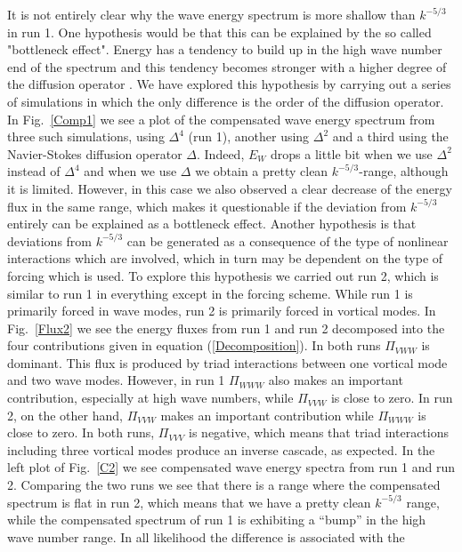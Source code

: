 { It is not entirely clear why the wave energy spectrum is more shallow than $ k^{-5/3}
$ in run 1. One hypothesis would be that this can be explained by the so called
"bottleneck effect". Energy has a tendency to build up in the high wave number end of
the spectrum and this tendency becomes stronger with a higher degree of the diffusion
operator \citep{Haugen2004}. We have explored this hypothesis by carrying out a series
of simulations in which the only difference is the order of the diffusion operator. In
Fig.~\ref{Comp1} we see a plot of the compensated wave energy spectrum from three such
simulations,  using $ \Delta^{4} $ (run 1), another using $ \Delta^{2} $ and a third
using the Navier-Stokes diffusion operator $ \Delta $. Indeed, $ E_W $ drops a little
bit when we use $ \Delta^2 $ instead of $ \Delta^{4} $ and when we use $ \Delta $ we
obtain a pretty clean $ k^{-5/3} $-range, although it is limited. However, in this case
we also observed a clear decrease of the energy flux in the same range, which makes it
questionable if the deviation from $ k^{-5/3} $ entirely can be explained as a
bottleneck effect.  Another hypothesis is that  deviations from $ k^{-5/3} $ can be
generated as a consequence of the type of nonlinear interactions which are involved,
which in turn may be dependent on the type of forcing which is used. To explore this
hypothesis we carried out run 2, which is similar to run 1 in everything except in the
forcing scheme. While run  1 is primarily forced in  wave modes, run 2 is primarily
forced in vortical modes. In Fig.~\ref{Flux2} we see the energy fluxes from run 1 and
run 2 decomposed into the four contributions given in equation (\ref{Decomposition}). In
both runs $ \Pi_{VWW} $ is dominant. This flux is produced by triad interactions between
one vortical mode and two wave modes. However, in run 1 $  \Pi_{WWW} $ also makes an
important contribution, especially at high wave numbers, while $ \Pi_{VVW} $ is close to
zero. In run 2,  on the other hand,  $ \Pi_{VVW} $ makes an important contribution while
$ \Pi_{WWW} $ is close to zero. In both runs, $ \Pi_{VVV} $ is negative, which means
that triad interactions including three vortical modes produce an inverse cascade, as
expected.  In the left plot of Fig.~\ref{C2} we  see compensated wave energy spectra from
run 1 and run 2. Comparing the two runs we see that there is a range where the
compensated spectrum is flat in run 2, which means that we have a pretty clean $
k^{-5/3} $ range, while the compensated spectrum of run 1 is exhibiting a ``bump'' in the
high wave number range.  In all likelihood the difference is associated with the
}
